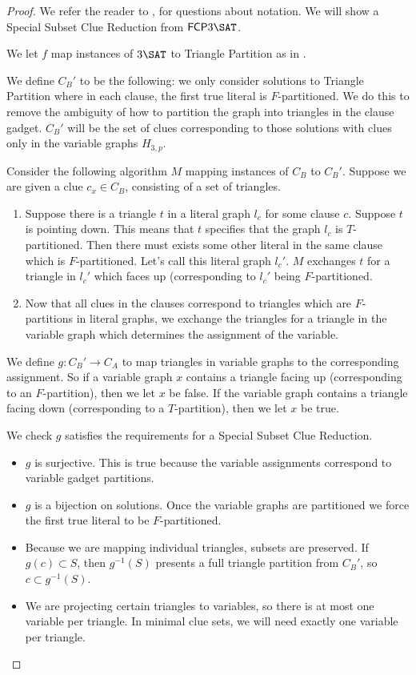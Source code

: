 \documentclass[runningheads,a4paper]{llncs}
\begin{document}
\begin{proof}
We refer the reader to \cite{holyer1981np}, \cite{colbourn1984complexity} for questions about notation. We will show a Special Subset Clue Reduction from $\mathsf{FCP} 3\SAT$. 

We let $f$ map instances of $3\SAT$ to Triangle Partition as in \cite{holyer1981np}.

We define $C_B'$ to be the following: we only consider solutions to Triangle Partition where in each clause, the first true literal is $F$-partitioned. We do this to remove the ambiguity of how to partition the graph into triangles in the clause gadget. $C_B'$ will be the set of clues corresponding to those solutions with clues only in the variable graphs $H_{3,p}$. 

Consider the following algorithm $M$ mapping instances of $C_B$ to $C_B'$. Suppose we are given a clue $c_x \in C_B$, consisting of a set of triangles. 
\begin{enumerate}
\item Suppose there is a triangle $t$ in a literal graph $l_c$ for some clause $c$. Suppose $t$ is pointing down. This means that $t$ specifies that the graph $l_c$ is $T$-partitioned. Then there must exists some other literal in the same clause which is $F$-partitioned. Let's call this literal graph $l_c'$. $M$ exchanges $t$ for a triangle in $l_c'$ which faces up (corresponding to $l_c'$ being $F$-partitioned. 
\item Now that all clues in the clauses correspond to triangles which are $F$-partitions in literal graphs, we exchange the triangles for a triangle in the variable graph which determines the assignment of the variable.
\end{enumerate}

We define $g: C_B' \rightarrow C_A$ to map triangles in variable graphs to the corresponding assignment. So if a variable graph $x$ contains a triangle facing up (corresponding to an $F$-partition), then we let $x$ be false. If the variable graph contains a triangle facing down (corresponding to a $T$-partition), then we let $x$ be true. 

We check $g$ satisfies the requirements for a Special Subset Clue Reduction.
\begin{itemize}
\item $g$ is surjective. This is true because the variable assignments correspond to variable gadget partitions.
\item $g$ is a bijection on solutions. Once the variable graphs are partitioned we force the first true literal to be $F$-partitioned. 
\item Because we are mapping individual triangles, subsets are preserved. If $g(c) \subset S$, then $g^{-1}(S)$ presents a full triangle partition from $C_B'$, so $c \subset g^{-1}(S)$. 
\item We are projecting certain triangles to variables, so there is at most one variable per triangle. In minimal clue sets, we will need exactly one variable per triangle.
\end{itemize}
\end{proof}
\end{document}
